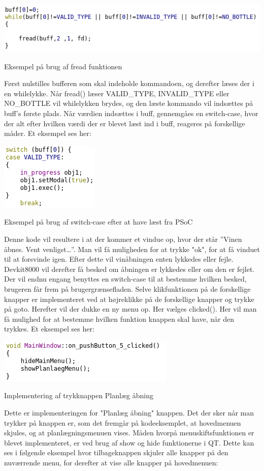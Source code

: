 \includegraphics{Billeder/read}
\caption{Eksempel på brug af fread funktionen}

Først nulstilles bufferen som skal indeholde kommandoen, og derefter læses der i en whilelykke. Når fread() læser VALID_TYPE, INVALID_TYPE eller NO_BOTTLE vil whilelykken brydes, og den læste kommando vil indsættes på buff’s første plads. Når værdien indsættes i buff, gennemgåes en switch-case, hvor der alt efter hvilken værdi der er blevet læst ind i buff, reageres på forskellige måder. Et eksempel ses her:

\includegraphics{Billeder/switch}
\caption{Eksempel på brug af switch-case efter at have læst fra PSoC}

Denne kode vil resultere i at der kommer et vindue op, hvor der står ”Vinen åbnes. Vent venligst…”. Man vil få muligheden for at trykke "ok", for at få vinduet til at forsvinde igen. 
Efter dette vil vinåbningen enten lykkedes eller fejle. Devkit8000 vil derefter få besked om åbningen er lykkedes eller om den er fejlet. Der vil endnu engang benyttes en switch-case til at bestemme hvilken besked, brugeren får frem på brugergrænsefladen.
Selve klikfunktionen på de forskellige knapper er implementeret ved at højreklikke på de forskellige knapper og trykke på goto. Herefter vil der dukke en ny menu op. Her vælges clicked(). Her vil man få mulighed for at bestemme hvilken funktion knappen skal have, når den trykkes. Et eksempel ses her:

\includegraphics{Billeder/pushButton}
\caption{Implementering af trykknappen Planlæg åbning}

Dette er implementeringen for "Planlæg åbning" knappen. Det der sker når man trykker på knappen er, som det fremgår på kodeeksemplet, at hovedmenuen skjules, og at planlægningsmenuen vises. 
Måden hvorpå menuskiftsfunktionen er blevet implementeret, er ved brug af show og hide funktionerne i QT. Dette kan ses i følgende eksempel hvor tilbageknappen skjuler alle knapper på den nuværrende menu, for derefter at vise alle knapper på hovedmenuen:

